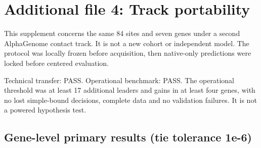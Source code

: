 \documentclass[
  11pt,
]{article}
\author{}
\date{}
\begin{document}
\section{Additional file 4: Track
portability}\label{additional-file-4-track-portability}

This supplement concerns the same 84 sites and seven genes under a
second AlphaGenome contact track. It is not a new cohort or independent
model. The protocol was locally frozen before acquisition, then
native-only predictions were locked before centered evaluation.

Technical transfer: PASS. Operational benchmark: PASS. The operational
threshold was at least 17 additional leaders and gains in at least four
genes, with no lost simple-bound decisions, complete data and no
validation failures. It is not a powered hypothesis test.

\subsection{Gene-level primary results (tie tolerance
1e-6)}\label{gene-level-primary-results-tie-tolerance-1e-6}
\end{document}
